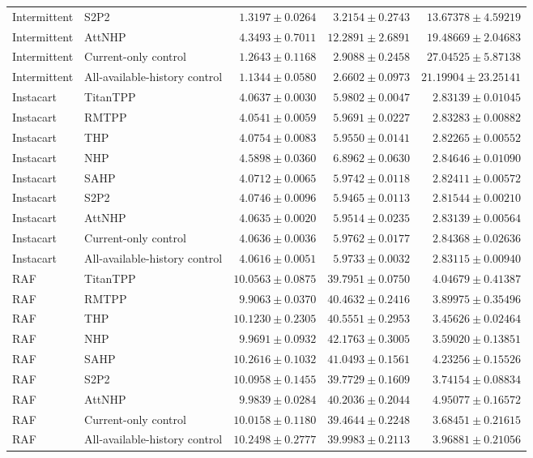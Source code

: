 \begin{table}[p]
{\begin{tabular}{llrrr}
Intermittent & S2P2 & $1.3197 \pm 0.0264$ & $3.2154 \pm 0.2743$ & $13.67378 \pm 4.59219$ \\
Intermittent & AttNHP & $4.3493 \pm 0.7011$ & $12.2891 \pm 2.6891$ & $19.48669 \pm 2.04683$ \\
Intermittent & Current-only control & $1.2643 \pm 0.1168$ & $2.9088 \pm 0.2458$ & $27.04525 \pm 5.87138$ \\
Intermittent & All-available-history control & $1.1344 \pm 0.0580$ & $2.6602 \pm 0.0973$ & $21.19904 \pm 23.25141$ \\
Instacart & TitanTPP & $4.0637 \pm 0.0030$ & $5.9802 \pm 0.0047$ & $2.83139 \pm 0.01045$ \\
Instacart & RMTPP & $4.0541 \pm 0.0059$ & $5.9691 \pm 0.0227$ & $2.83283 \pm 0.00882$ \\
Instacart & THP & $4.0754 \pm 0.0083$ & $5.9550 \pm 0.0141$ & $2.82265 \pm 0.00552$ \\
Instacart & NHP & $4.5898 \pm 0.0360$ & $6.8962 \pm 0.0630$ & $2.84646 \pm 0.01090$ \\
Instacart & SAHP & $4.0712 \pm 0.0065$ & $5.9742 \pm 0.0118$ & $2.82411 \pm 0.00572$ \\
Instacart & S2P2 & $4.0746 \pm 0.0096$ & $5.9465 \pm 0.0113$ & $2.81544 \pm 0.00210$ \\
Instacart & AttNHP & $4.0635 \pm 0.0020$ & $5.9514 \pm 0.0235$ & $2.83139 \pm 0.00564$ \\
Instacart & Current-only control & $4.0636 \pm 0.0036$ & $5.9762 \pm 0.0177$ & $2.84368 \pm 0.02636$ \\
Instacart & All-available-history control & $4.0616 \pm 0.0051$ & $5.9733 \pm 0.0032$ & $2.83115 \pm 0.00940$ \\
RAF & TitanTPP & $10.0563 \pm 0.0875$ & $39.7951 \pm 0.0750$ & $4.04679 \pm 0.41387$ \\
RAF & RMTPP & $9.9063 \pm 0.0370$ & $40.4632 \pm 0.2416$ & $3.89975 \pm 0.35496$ \\
RAF & THP & $10.1230 \pm 0.2305$ & $40.5551 \pm 0.2953$ & $3.45626 \pm 0.02464$ \\
RAF & NHP & $9.9691 \pm 0.0932$ & $42.1763 \pm 0.3005$ & $3.59020 \pm 0.13851$ \\
RAF & SAHP & $10.2616 \pm 0.1032$ & $41.0493 \pm 0.1561$ & $4.23256 \pm 0.15526$ \\
RAF & S2P2 & $10.0958 \pm 0.1455$ & $39.7729 \pm 0.1609$ & $3.74154 \pm 0.08834$ \\
RAF & AttNHP & $9.9839 \pm 0.0284$ & $40.2036 \pm 0.2044$ & $4.95077 \pm 0.16572$ \\
RAF & Current-only control & $10.0158 \pm 0.1180$ & $39.4644 \pm 0.2248$ & $3.68451 \pm 0.21615$ \\
RAF & All-available-history control & $10.2498 \pm 0.2777$ & $39.9983 \pm 0.2113$ & $3.96881 \pm 0.21056$ \\
\bottomrule
\end{tabular}}
\end{table}
